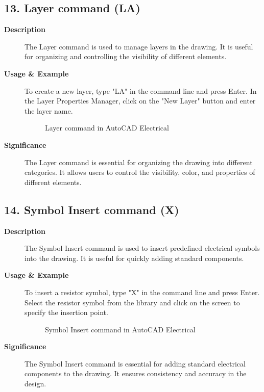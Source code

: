 \documentclass[12pt]{article}
\begin{document}
\subsection*{13. Layer command (LA)}
\begin{description}
    \item [\textbf{Description}] The Layer command is used to manage layers in the drawing. It is useful for organizing and controlling the visibility of different elements.
    \item [\textbf{Usage \& Example}] To create a new layer, type "LA" in the command line and press Enter. In the Layer Properties Manager, click on the "New Layer" button and enter the layer name.
          \begin{figure}[H]
              \centering
              \caption{Layer command in AutoCAD Electrical}
          \end{figure}
    \item [\textbf{Significance}] The Layer command is essential for organizing the drawing into different categories. It allows users to control the visibility, color, and properties of different elements.
\end{description}

\subsection*{14. Symbol Insert command (X)}
\begin{description}
    \item [\textbf{Description}] The Symbol Insert command is used to insert predefined electrical symbols into the drawing. It is useful for quickly adding standard components.
    \item [\textbf{Usage \& Example}] To insert a resistor symbol, type "X" in the command line and press Enter. Select the resistor symbol from the library and click on the screen to specify the insertion point.
          \begin{figure}[H]
              \centering
              \caption{Symbol Insert command in AutoCAD Electrical}
          \end{figure}
    \item [\textbf{Significance}] The Symbol Insert command is essential for adding standard electrical components to the drawing. It ensures consistency and accuracy in the design.
\end{description}
\end{document}

